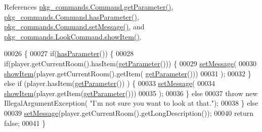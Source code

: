 References \hyperlink{Command_8java_source_l00041}{pkg\-\_\-commands.\-Command.\-get\-Parameter()}, \hyperlink{Command_8java_source_l00073}{pkg\-\_\-commands.\-Command.\-has\-Parameter()}, \hyperlink{Command_8java_source_l00089}{pkg\-\_\-commands.\-Command.\-set\-Message()}, and \hyperlink{LookCommand_8java_source_l00048}{pkg\-\_\-commands.\-Look\-Command.\-show\-Item()}.


\begin{DoxyCode}
00026                                                                           \{
00027         \textcolor{keywordflow}{if}(\hyperlink{classpkg__commands_1_1Command_a02af95ab3f1898a66259ab7c177b6998}{hasParameter}()) \{
00028             \textcolor{keywordflow}{if}(player.getCurrentRoom().hasItem(\hyperlink{classpkg__commands_1_1Command_a41c92d445be73ea9d62320c65efb8434}{getParameter}())) \{
00029                 \hyperlink{classpkg__commands_1_1Command_ae210ff216fe908b111ba1c988a963d13}{setMessage}(
00030                         \hyperlink{classpkg__commands_1_1LookCommand_a17808882dffb0a9edce192235c029ddf}{showItem}(player.getCurrentRoom().getItem(
      \hyperlink{classpkg__commands_1_1Command_a41c92d445be73ea9d62320c65efb8434}{getParameter}()))
00031                         );
00032             \} \textcolor{keywordflow}{else} \textcolor{keywordflow}{if} (player.hasItem(\hyperlink{classpkg__commands_1_1Command_a41c92d445be73ea9d62320c65efb8434}{getParameter}()) ) \{
00033                 \hyperlink{classpkg__commands_1_1Command_ae210ff216fe908b111ba1c988a963d13}{setMessage}(
00034                         \hyperlink{classpkg__commands_1_1LookCommand_a17808882dffb0a9edce192235c029ddf}{showItem}(player.getItem(\hyperlink{classpkg__commands_1_1Command_a41c92d445be73ea9d62320c65efb8434}{getParameter}()))
00035                         );
00036             \} \textcolor{keywordflow}{else}
00037                 \textcolor{keywordflow}{throw} \textcolor{keyword}{new} IllegalArgumentException( \textcolor{stringliteral}{"I'm not sure you want to look at that."});
00038         \} \textcolor{keywordflow}{else}
00039             \hyperlink{classpkg__commands_1_1Command_ae210ff216fe908b111ba1c988a963d13}{setMessage}(player.getCurrentRoom().getLongDescription());
00040         \textcolor{keywordflow}{return} \textcolor{keyword}{false};
00041     \}
\end{DoxyCode}


